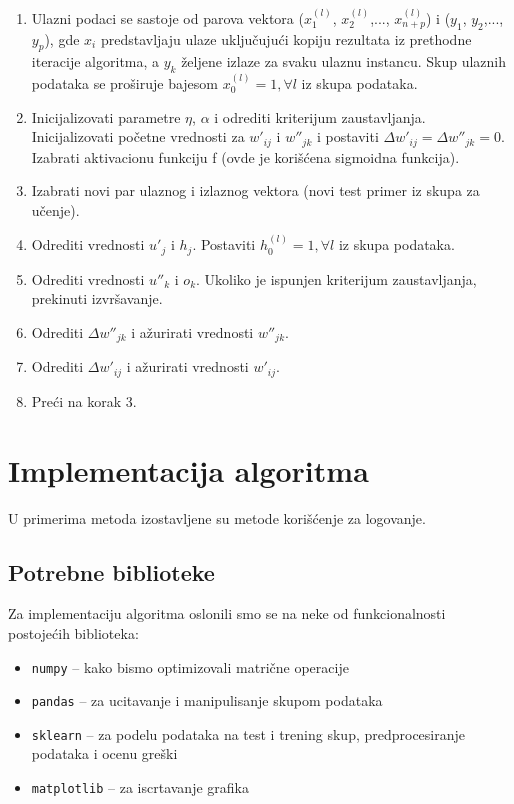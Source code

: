 \documentclass[a4paper]{article}
\begin{document}
\begin{enumerate}
  \item Ulazni podaci se sastoje od parova vektora ($x^{(l)}_1$, $x^{(l)}_2$,..., $x^{(l)}_{n+p}$) i ($y_1$, $y_2$,..., $y_p$), gde $x_i$ predstavljaju ulaze uključujući kopiju rezultata iz prethodne iteracije algoritma, a $y_k$ željene izlaze za svaku ulaznu instancu. Skup ulaznih podataka se proširuje bajesom $x^{(l)}_0=1, {}\forall{l}$ iz skupa podataka.
  \item Inicijalizovati parametre $\eta{}$, $\alpha{}$ i odrediti kriterijum zaustavljanja. Inicijalizovati početne vrednosti za $w'_{ij}$ i $w{''}_{jk}$ i postaviti $\Delta{}w'_{ij}=\Delta{}w{''}_{jk}=0$. Izabrati aktivacionu funkciju f (ovde je korišćena sigmoidna funkcija).
  \item Izabrati novi par ulaznog i izlaznog vektora (novi test primer iz skupa za učenje).
  \item Odrediti vrednosti $u'_j$ i $h_j$. Postaviti $h^{(l)}_0=1, {}\forall{l}$ iz skupa podataka.
  \item Odrediti vrednosti $u{''}_k$ i $o_k$. Ukoliko je ispunjen kriterijum zaustavljanja, prekinuti izvršavanje.
  \item Odrediti $\Delta{}w{''}_{jk}$ i ažurirati vrednosti $w{''}_{jk}$.
  \item Odrediti $\Delta{}w{'}_{ij}$ i ažurirati vrednosti $w{'}_{ij}$.
  \item Preći na korak 3.
\end{enumerate}


\section{Implementacija algoritma}

U primerima metoda izostavljene su metode korišćenje za logovanje.

\subsection{Potrebne biblioteke}
Za implementaciju algoritma oslonili smo se na neke od funkcionalnosti postojećih biblioteka:
\begin{itemize}
    \item \texttt{numpy} -- kako bismo optimizovali matrične operacije
    \item \texttt{pandas} -- za ucitavanje i manipulisanje skupom podataka
    \item \texttt{sklearn} -- za podelu podataka na test i trening skup, predprocesiranje podataka i ocenu greški
    \item \texttt{matplotlib} -- za iscrtavanje grafika
\end{itemize}
\end{document}
